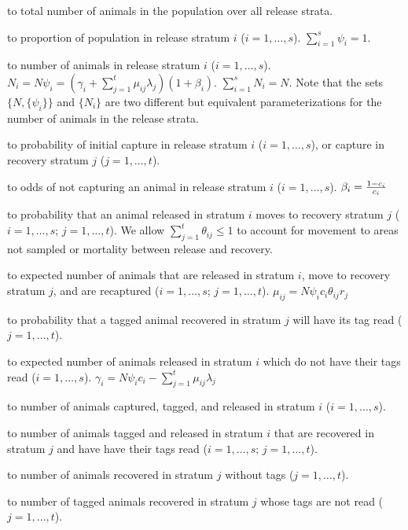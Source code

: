 
{\parindent=2cm   %
\def\litem#1{\item{\hbox to\parindent{\enspace#1\hfill}}} 
 
\litem{$N$} total number of animals in the population over all release strata.

\litem{$\psi _i$} proportion of population in release stratum $i$ ($i=1,\ldots ,s$).
$\sum\limits_{i=1}^s {\psi _i}=1$.

\litem{$N_i$} number of animals in release stratum $i$ ($i=1,\ldots ,s$). 
$N_i=N\psi_i=( {\gamma _i+\sum\limits_{j=1}^t {\mu _{ij}\lambda _j}}
)( {1+\beta _i} )$.
$\sum\limits_{i=1}^s {N_i}=N$. 
Note that the sets $\{N,\{\psi_i\}\}$ and $\{N_i\}$ are two different
but equivalent parameterizations for the number of animals in the release strata.

\litem{$c_i ,r_j$} probability of initial capture in release stratum $i$ ($i=1,\ldots ,s$),
or capture in recovery stratum $j$ ($j=1,\ldots ,t$).

\litem{$\beta _i$} odds of not capturing an animal in 
release stratum $i$ ($i=1,\ldots ,s$).
$\beta _i={{1-c_i} \over {c_i}}$ 

\litem{$\theta _{ij}$} probability that an animal released in stratum $i$
moves to recovery stratum $j$ ($i=1,\ldots ,s$; $j=1,\ldots ,t$). We allow 
$\sum\limits_{j=1}^t {\theta _{ij}}\le 1$
to account for movement to areas not sampled or mortality between release
and recovery.

\litem{$\mu _{ij}$} expected number of animals that 
are released in stratum $i$, move to recovery stratum $j$, and are recaptured
($i=1,\ldots ,s$; $j=1,\ldots ,t$). 
$\mu _{ij}=N\psi _ic_i\theta _{ij}r_j$ 

\litem{$\lambda _j$} probability that a tagged animal recovered in stratum $j$ 
will have its tag read ($j=1,\ldots ,t$). 

\litem{$\gamma _i$} expected number of animals released in 
stratum $i$ which do not have their tags read
($i=1,\ldots ,s$).
$\gamma _i=N\psi _ic_i-\sum\limits_{j=1}^t {\mu _{ij}\lambda _j}$ 

\par} %


{\parindent=2cm   %
\def\litem#1{\item{\hbox to\parindent{\enspace#1\hfill}}} 

\litem{$n_i^c$}  number of animals captured, tagged, and released in stratum $i$
($i=1,\ldots ,s$). 

\litem{$m_{ij}$} number of animals tagged and released in stratum $i$ that 
are recovered in stratum $j$ and have have their tags read
($i=1,\ldots ,s$; $j=1,\ldots ,t$). 

\litem{$u_j$} number of animals recovered in stratum $j$ without tags
($j=1,\ldots ,t$).

\litem{$z_j$}  number of tagged animals recovered in stratum $j$ whose
tags are not read
($j=1,\ldots ,t$). 
\par} %

